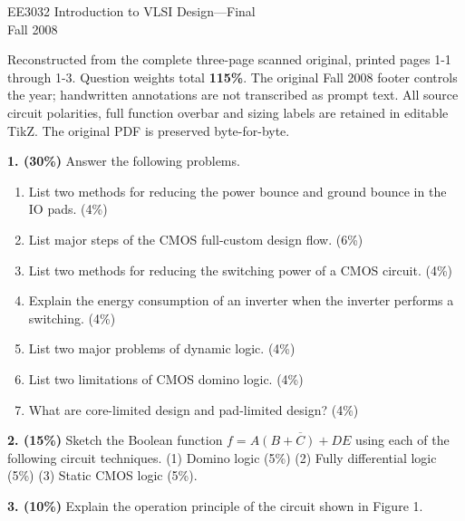 \documentclass[10pt]{article}
\newcommand{\mos}[4]{\begin{scope}[shift={(#1,#2)}]
\draw(0,.24)--(0,-.24);\draw(0,.2)--(.25,.2)--(.25,.5);\draw(0,-.2)--(.25,-.2)--(.25,-.5);
\draw(-.16,.23)--(-.16,-.23);
\ifnum#4=1\draw(-.26,0)circle(.06);\draw(-.75,0)--(-.32,0);\else\draw(-.75,0)--(-.16,0);\fi
\node[anchor=east,font=\scriptsize]at(-.76,0){$#3$};\end{scope}}
\newcommand{\gnd}[2]{\draw(#1,#2)--(#1,{#2-.12});\draw({#1-.17},{#2-.12})--({#1+.17},{#2-.12});\draw({#1-.11},{#2-.2})--({#1+.11},{#2-.2});}
\newcommand{\rail}[3]{\draw(#1,#2)--(#1,{#2+.14});\node[above,font=\scriptsize]at(#1,{#2+.14}){$#3$};}
\begin{document}
\begin{center}{\Large EE3032 Introduction to VLSI Design---Final}\\Fall 2008\end{center}
Reconstructed from the complete three-page scanned original, printed pages 1-1 through 1-3. Question weights total \textbf{115\%}. The original Fall 2008 footer controls the year; handwritten annotations are not transcribed as prompt text. All source circuit polarities, full function overbar and sizing labels are retained in editable TikZ. The original PDF is preserved byte-for-byte.\par\medskip
\textbf{1. (30\%)} Answer the following problems.
\begin{enumerate}[label=(\alph*)]
\item List two methods for reducing the power bounce and ground bounce in the IO pads. (4\%)
\item List major steps of the CMOS full-custom design flow. (6\%)
\item List two methods for reducing the switching power of a CMOS circuit. (4\%)
\item Explain the energy consumption of an inverter when the inverter performs a switching. (4\%)
\item List two major problems of dynamic logic. (4\%)
\item List two limitations of CMOS domino logic. (4\%)
\item What are core-limited design and pad-limited design? (4\%)
\end{enumerate}\textbf{2. (15\%)} Sketch the Boolean function $f=\overline{A(B+C)+DE}$ using each of the following circuit techniques. (1) Domino logic (5\%) (2) Fully differential logic (5\%) (3) Static CMOS logic (5\%).\par\medskip\textbf{3. (10\%)} Explain the operation principle of the circuit shown in Figure 1.\begin{center}
\end{center}
\end{document}
